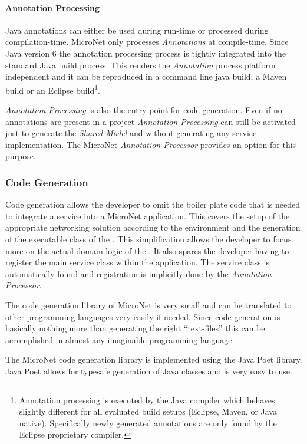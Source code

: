  \paragraph{Annotation Processing}
 
Java annotations can either be used during run-time or processed during
compilation-time. MicroNet only processes \textit{Annotations} at compile-time.
Since Java version 6 the annotation processing process is tightly integrated
into the standard Java build process. This renders the \textit{Annotation}
process platform independent and it can be reproduced in a command line java
build, a Maven build or an Eclipse build\footnote{Annotation processing is
executed by the Java compiler which behaves slightly different for all evaluated
build setups (Eclipse, Maven, or Java native). Specifically newly generated
annotations are only found by the Eclipse proprietary compiler.}.

\textit{Annotation Processing} is also the entry point for code generation.
Even if no annotations are present in a project \textit{Annotation Processing}
can still be activated just to generate the \textit{Shared Model} and without
generating any service implementation. The MicroNet \textit{Annotation
Processor} provides an option for this purpose.

\subsubsection{Code Generation}

Code generation allows the developer to omit the boiler plate code that is
needed to integrate a service into a MicroNet application. This covers the setup
of the appropriate networking solution according to the environment and the
generation of the executable class of the \ms{}. This simplification allows the
developer to focus more on the actual domain logic of the \ms{}. It also spares
the developer having to register the main service class within the
application. The service class is automatically found and registration is
implicitly done by the \textit{Annotation Processor}.

The code generation library of MicroNet is very small and can be translated to
other programming languages very easily if needed. Since code generation is
basically nothing more than generating the right ``text-files'' this can be
accomplished in almost any imaginable programming language.

The MicroNet code generation library is implemented using the Java Poet
library. Java Poet allows for typesafe generation of Java classes and is very
easy to use. 

